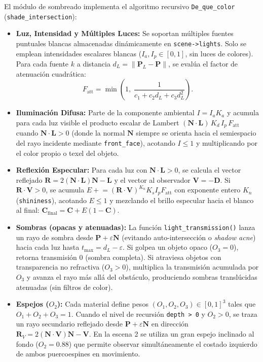 \documentclass[11pt,letterpaper]{article}
\begin{document}
El módulo de sombreado implementa el algoritmo recursivo \texttt{De\_que\_color} (\texttt{shade\_intersection}):

\begin{itemize}[leftmargin=1.5em]
    \item \textbf{Luz, Intensidad y Múltiples Luces:} Se soportan múltiples fuentes puntuales blancas almacenadas dinámicamente en \texttt{scene->lights}. Solo se emplean intensidades escalares blancas ($I_a, I_p \in [0, 1]$, sin luces de colores). Para cada fuente $k$ a distancia $d_L = \|\mathbf{P}_L - \mathbf{P}\|$, se evalúa el factor de atenuación cuadrática:
    \[
        F_{\text{att}} = \min\!\left(1,\; \frac{1}{c_1 + c_2 d_L + c_3 d_L^2}\right).
    \]

    \item \textbf{Iluminación Difusa:} Parte de la componente ambiental $I = I_a K_a$ y acumula para cada luz visible el producto escalar de Lambert $(\mathbf{N}\cdot\mathbf{L})\,K_d\,I_p\,F_{\text{att}}$ cuando $\mathbf{N}\cdot\mathbf{L} > 0$ (donde la normal $\mathbf{N}$ siempre se orienta hacia el semiespacio del rayo incidente mediante \texttt{front\_face}), acotando $I \le 1$ y multiplicando por el color propio o texel del objeto.

    \item \textbf{Reflexión Especular:} Para cada luz con $\mathbf{N}\cdot\mathbf{L} > 0$, se calcula el vector reflejado $\mathbf{R} = 2(\mathbf{N}\cdot\mathbf{L})\mathbf{N} - \mathbf{L}$ y el vector al observador $\mathbf{V} = -\mathbf{D}$. Si $\mathbf{R}\cdot\mathbf{V} > 0$, se acumula $E \mathrel{+}= (\mathbf{R}\cdot\mathbf{V})^{K_n} K_s I_p F_{\text{att}}$ con exponente entero $K_n$ (\texttt{shininess}), acotando $E \le 1$ y mezclando el brillo especular hacia el blanco al final: $\mathbf{C}_{\text{final}} = \mathbf{C} + E(1 - \mathbf{C})$.

    \item \textbf{Sombras (opacas y atenuadas):} La función \texttt{light\_transmission()} lanza un rayo de sombra desde $\mathbf{P} + \varepsilon\mathbf{N}$ (evitando auto-intersección o \textit{shadow acne}) hacia cada luz hasta $t_{\max} = d_L - \varepsilon$. Si golpea un objeto opaco ($O_3 = 0$), retorna transmisión $0$ (sombra completa). Si atraviesa objetos con transparencia no refractiva ($O_3 > 0$), multiplica la transmisión acumulada por $O_3$ y avanza el rayo más allá del obstáculo, produciendo sombras translúcidas atenuadas (sin filtros de color).

    \item \textbf{Espejos ($O_2$):} Cada material define pesos $(O_1, O_2, O_3) \in [0,1]^3$ tales que $O_1 + O_2 + O_3 = 1$. Cuando el nivel de recursión \texttt{depth > 0} y $O_2 > 0$, se traza un rayo secundario reflejado desde $\mathbf{P} + \varepsilon\mathbf{N}$ en dirección $\mathbf{R}_V = 2(\mathbf{N}\cdot\mathbf{V})\mathbf{N} - \mathbf{V}$. En la escena 2 se utiliza un gran espejo inclinado al fondo ($O_2 = 0.88$) que permite observar simultáneamente el costado izquierdo de ambos puercoespines en movimiento.


\end{itemize}
\end{document}
